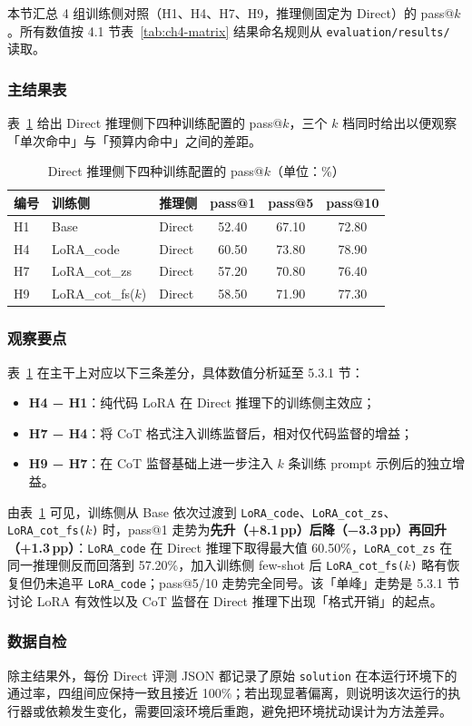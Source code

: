 
本节汇总 4 组训练侧对照（H1、H4、H7、H9，推理侧固定为 Direct）的 pass@$k$。所有数值按 4.1 节表~\ref{tab:ch4-matrix} 结果命名规则从 \texttt{evaluation/results/} 读取。

\subsubsection{主结果表}
表~\ref{tab:ch5-direct} 给出 Direct 推理侧下四种训练配置的 pass@$k$，三个 $k$ 档同时给出以便观察「单次命中」与「预算内命中」之间的差距。

\begin{table}[!htb]
  \centering
  \caption{Direct 推理侧下四种训练配置的 pass@$k$（单位：\%）}
  \label{tab:ch5-direct}
  \footnotesize
  \begin{tabular}{lllccc}
    \toprule
    编号 & 训练侧 & 推理侧 & pass@1 & pass@5 & pass@10 \\
    \midrule
    H1 & Base               & Direct & 52.40 & 67.10 & 72.80 \\
    H4 & LoRA\_code         & Direct & 60.50 & 73.80 & 78.90 \\
    H7 & LoRA\_cot\_zs      & Direct & 57.20 & 70.80 & 76.40 \\
    H9 & LoRA\_cot\_fs($k$) & Direct & 58.50 & 71.90 & 77.30 \\
    \bottomrule
  \end{tabular}
\end{table}

\subsubsection{观察要点}
表~\ref{tab:ch5-direct} 在主干上对应以下三条差分，具体数值分析延至 5.3.1 节：
\begin{itemize}
    \item \textbf{H4 − H1}：纯代码 LoRA 在 Direct 推理下的训练侧主效应；
    \item \textbf{H7 − H4}：将 CoT 格式注入训练监督后，相对仅代码监督的增益；
    \item \textbf{H9 − H7}：在 CoT 监督基础上进一步注入 $k$ 条训练 prompt 示例后的独立增益。
\end{itemize}
由表~\ref{tab:ch5-direct} 可见，训练侧从 Base 依次过渡到 \texttt{LoRA\_code}、\texttt{LoRA\_cot\_zs}、\texttt{LoRA\_cot\_fs($k$)} 时，pass@1 走势为\textbf{先升（+8.1\,pp）后降（−3.3\,pp）再回升（+1.3\,pp）}：\texttt{LoRA\_code} 在 Direct 推理下取得最大值 60.50\%，\texttt{LoRA\_cot\_zs} 在同一推理侧反而回落到 57.20\%，加入训练侧 few-shot 后 \texttt{LoRA\_cot\_fs($k$)} 略有恢复但仍未追平 \texttt{LoRA\_code}；pass@5/10 走势完全同号。该「单峰」走势是 5.3.1 节讨论 LoRA 有效性以及 CoT 监督在 Direct 推理下出现「格式开销」的起点。

\subsubsection{数据自检}
除主结果外，每份 Direct 评测 JSON 都记录了原始 \texttt{solution} 在本运行环境下的通过率，四组间应保持一致且接近 100\%；若出现显著偏离，则说明该次运行的执行器或依赖发生变化，需要回滚环境后重跑，避免把环境扰动误计为方法差异。